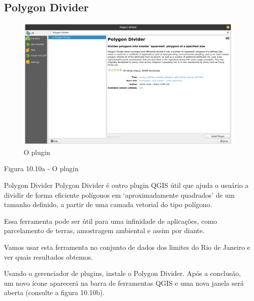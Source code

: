 \documentclass[
]{krantz}
\begin{document}
\hypertarget{polygon-divider}{%
\subsection{Polygon Divider}\label{polygon-divider}}

\begin{figure}
\centering
\includegraphics{media/modulo10/fig1010_a.png}
\caption{O plugin}
\end{figure}

Figura 10.10a - O plugin

Polygon Divider Polygon Divider é outro plugin QGIS útil que ajuda o usuário a dividir de forma eficiente polígonos em `aproximadamente quadrados' de um tamanho definido, a partir de uma camada vetorial do tipo polígono.

Essa ferramenta pode ser útil para uma infinidade de aplicações, como parcelamento de terras, amostragem ambiental e assim por diante.

Vamos usar esta ferramenta no conjunto de dados dos limites do Rio de Janeiro e ver quais resultados obtemos.

Usando o gerenciador de plugins, instale o Polygon Divider. Após a conclusão, um novo ícone aparecerá na barra de ferramentas QGIS e uma nova janela será aberta (consulte a figura 10.10b).
\end{document}
